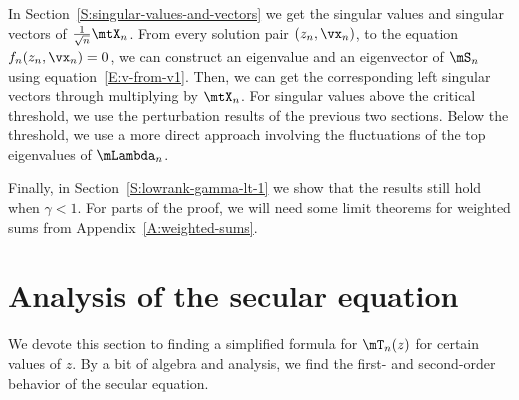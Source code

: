 In Section~\ref{S:singular-values-and-vectors} we get the singular values and singular vectors of $\frac{1}{\sqrt{n}} \mtX_n$.  From every solution pair $(z_n, \vx_n)$, to the equation $f_n(z_n, \vx_n) = 0$, we can construct an eigenvalue and an eigenvector of $\mS_n$ using equation~\eqref{E:v-from-v1}.  Then, we can get the corresponding left singular vectors through multiplying by $\mtX_n$.  For singular values above the critical threshold, we use the perturbation results of the previous two sections.  Below the threshold, we use a more direct approach involving the fluctuations of the top eigenvalues of $\mLambda_n$.

Finally, in Section~\ref{S:lowrank-gamma-lt-1} we show that the results still hold when $\gamma < 1$.  For parts of the proof, we will need some limit theorems for weighted sums from 
Appendix~\ref{A:weighted-sums}.

\section{Analysis of the secular equation}\label{S:anal-sec-eqn}

We devote this section to finding a simplified formula for $\mT_n(z)$ for certain values of $z$.  By a bit of algebra and analysis, we find the first- and second-order behavior of the secular equation.

